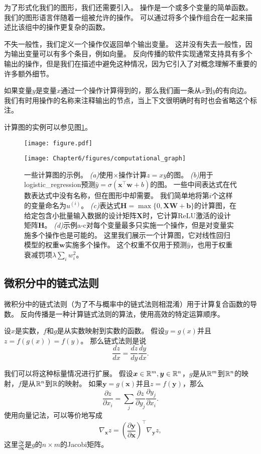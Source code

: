 为了形式化我们的图形，我们还需要引入。
操作是一个或多个变量的简单函数。
我们的图形语言伴随着一组被允许的操作。
可以通过将多个操作组合在一起来描述比该组中的操作更复杂的函数。


不失一般性，我们定义一个操作仅返回单个输出变量。
这并没有失去一般性，因为输出变量可以有多个条目，例如向量。
反向传播的软件实现通常支持具有多个输出的操作，但是我们在描述中避免这种情况，因为它引入了对概念理解不重要的许多额外细节。

如果变量$y$是变量$x$通过一个操作计算得到的，那么我们画一条从$x$到$y$的有向边。
我们有时用操作的名称来注释输出的节点，当上下文很明确时有时也会省略这个标注。

计算图的实例可以参见图\ref{fig:chap6_computational_graph}。
\begin{figure}[!htb]
\ifOpenSource
\centerline{\texttt{[image: figure.pdf]}}
\else
\centerline{\texttt{[image: Chapter6/figures/computational\_graph]}}
\fi
\captionsetup{singlelinecheck=off}
\caption{一些计算图的示例。
\emph{(a)}使用$\times$操作计算$z = xy$的图。 
\emph{(b)}用于\gls{logistic_regression}预测$\hat{y} = \sigma(\bm{x}^\top \bm{w} + b)$的图。 一些中间表达式在代数表达式中没有名称，但在图形中却需要。
我们简单地将第$i$个这样的变量命名为$u^{(i)}$。
\emph{(c)}表达式$\bm{H} = \max \{ 0, \bm{X}\bm{W}+ \bm{b} \}$的计算图，在给定包含小批量输入数据的设计矩阵$\bm{X}$时，它计算\gls{ReLU}激活的设计矩阵$\bm{H}$。
\emph{(d)}示例a-c对每个变量最多只实施一个操作，但是对变量实施多个操作也是可能的。 这里我们展示一个计算图，它对线性回归模型的权重$\bm{w}$实施多个操作。
这个权重不仅用于预测$\hat{y}$，也用于权重衰减罚项$\lambda \sum_i w_i^2$。}
\label{fig:chap6_computational_graph}
\end{figure}

\subsection{微积分中的链式法则}
\label{sec:chain_rule_of_calculus}

微积分中的链式法则（为了不与概率中的链式法则相混淆）用于计算复合函数的导数。
反向传播是一种计算链式法则的算法，使用高效的特定运算顺序。

设$x$是实数，$f$和$g$是从实数映射到实数的函数。
假设$y=g(x)$并且$z=f(g(x))=f(y)$。
那么链式法则是说
\begin{equation}
\frac{dz}{dx}=\frac{dz}{dy} \frac{dy}{dx}.
\label{eq:6.44}
\end{equation}

我们可以将这种标量情况进行扩展。
假设$\bm{x}\in \mathbb{R}^m, \bm{y}\in \mathbb{R}^n$，$g$是从$\mathbb{R}^m$到$\mathbb{R}^n$的映射，$f$是从$\mathbb{R}^n$到$\mathbb{R}$的映射。
如果$\bm{y}=g(\bm{x})$并且$z=f(\bm{y})$，那么
\begin{equation}
\frac{\partial z}{\partial x_i} = \sum_j \frac{\partial z}{\partial y_j} \frac{\partial y_j}{\partial x_i}.
\end{equation}
使用向量记法，可以等价地写成
\begin{equation}
\nabla_{\bm{x}}z = \left ( \frac{\partial \bm{y}}{\partial \bm{x}} \right )^\top \nabla_{\bm{y}} z,
\end{equation}
这里$\frac{\partial \bm{y}}{\partial \bm{x}}$是$g$的$n\times m$的Jacobi矩阵。


